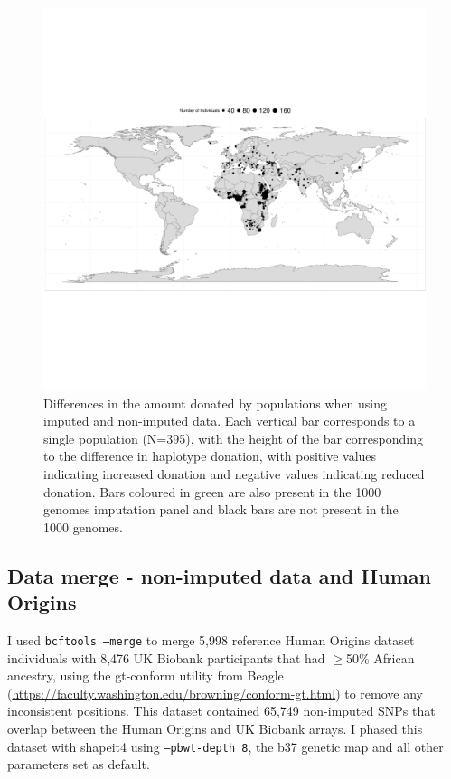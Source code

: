 
\begin{figure}
	    \centering
	    \includegraphics[width=1.0\textwidth]{../images/chapter3/HumanOriginsMap.pdf}
	    \caption{Differences in the amount donated by populations when using imputed and non-imputed data. Each vertical bar corresponds to a single population (N=395), with the height of the bar corresponding to the difference in haplotype donation, with positive values indicating increased donation and negative values indicating reduced donation. Bars coloured in green are also present in the 1000 genomes imputation panel and black bars are not present in the 1000 genomes.}
	    \label{fig:HumanOriginsMap}
\end{figure}

\subsection{Data merge - non-imputed data and Human Origins}

I used \texttt{bcftools --merge} to merge 5,998 reference Human Origins dataset individuals with 8,476 UK Biobank participants that had $\geq$50\% African ancestry, using the gt-conform utility from Beagle (\url{https://faculty.washington.edu/browning/conform-gt.html}) to remove any inconsistent positions. This dataset contained 65,749 non-imputed SNPs that overlap between the Human Origins and UK Biobank arrays. I phased this dataset with shapeit4 \cite{delaneau2018integrative} using \texttt{--pbwt-depth 8}, the b37 genetic map and all other parameters set as default.  

